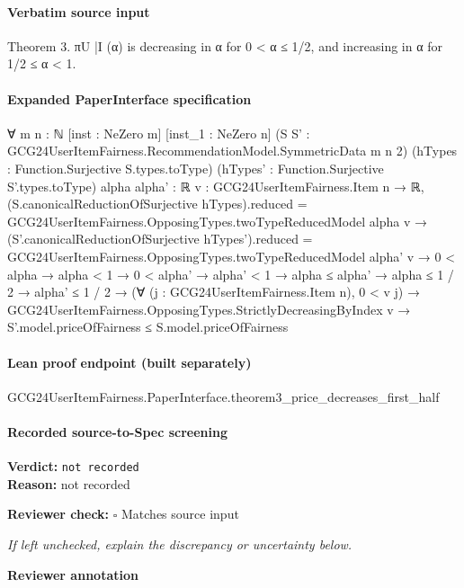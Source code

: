 \documentclass[10pt]{article}
\newcommand{\reviewerbox}{%
  \par\noindent\fbox{\parbox{0.96\linewidth}{\rule{0pt}{0.38in}}}\par
}
\newcommand{\reviewmatch}[1]{%
  \par\noindent\textbf{Reviewer check:} $\square$\; #1\par
  \noindent\emph{If left unchecked, explain the discrepancy or uncertainty below.}\par
}
\begin{document}
\paragraph{Verbatim source input}
\begin{ReviewVerbatim}
Theorem 3. πU
|I (α) is decreasing in α for 0 < α ≤ 1/2, and increasing in α for 1/2 ≤ α < 1.
\end{ReviewVerbatim}


\paragraph{Expanded PaperInterface specification}
\begin{ReviewVerbatim}
∀ {m n : ℕ} [inst : NeZero m] [inst_1 : NeZero n] (S S' : GCG24UserItemFairness.RecommendationModel.SymmetricData m n 2)
  (hTypes : Function.Surjective S.types.toType) (hTypes' : Function.Surjective S'.types.toType) {alpha alpha' : ℝ}
  {v : GCG24UserItemFairness.Item n → ℝ},
  (S.canonicalReductionOfSurjective hTypes).reduced = GCG24UserItemFairness.OpposingTypes.twoTypeReducedModel alpha v →
    (S'.canonicalReductionOfSurjective hTypes').reduced =
        GCG24UserItemFairness.OpposingTypes.twoTypeReducedModel alpha' v →
      0 < alpha →
        alpha < 1 →
          0 < alpha' →
            alpha' < 1 →
              alpha ≤ alpha' →
                alpha ≤ 1 / 2 →
                  alpha' ≤ 1 / 2 →
                    (∀ (j : GCG24UserItemFairness.Item n), 0 < v j) →
                      GCG24UserItemFairness.OpposingTypes.StrictlyDecreasingByIndex v →
                        S'.model.priceOfFairness ≤ S.model.priceOfFairness
\end{ReviewVerbatim}

\paragraph{Lean proof endpoint (built separately)}\begin{ReviewVerbatim}
GCG24UserItemFairness.PaperInterface.theorem3_price_decreases_first_half
\end{ReviewVerbatim}

\paragraph{Recorded source-to-Spec screening}
\textbf{Verdict:} \texttt{not recorded}
\\
\textbf{Reason:} not recorded
\reviewmatch{Matches source input}
\noindent\textbf{Reviewer annotation}\par
\reviewerbox
\clearpage
\hypertarget{source-claim-9cd33ed0f79952fe}{}
\end{document}
